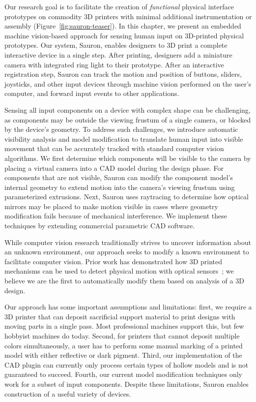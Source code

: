 Our research goal is to facilitate the creation of \emph{functional} physical interface prototypes on commodity 3D printers with minimal additional instrumentation or assembly (Figure~\ref{fig:sauron-teaser}). In this chapter, we present an embedded machine vision-based approach for sensing human input on 3D-printed physical prototypes. Our system, Sauron, enables designers to 3D print a complete interactive device in a single step. After printing, designers add a miniature camera with integrated ring light to their prototype. After an interactive registration step, Sauron can track the motion and position of buttons, sliders, joysticks, and other input devices through machine vision performed on the user's computer, and forward input events to other applications.

Sensing all input components on a device with complex shape can be challenging, as components may be outside the viewing frustum of a single camera, or blocked by the device's geometry. To address such challenges, we introduce automatic visibility analysis and model modification 
to translate human input into visible movement that can be accurately tracked with standard computer vision algorithms. We first determine which components will be visible to the camera by placing a virtual camera into a CAD model during the design phase. For components that are not visible, Sauron can modify the component model's internal geometry to extend motion into the camera's viewing frustum using parameterized extrusions. Next, Sauron uses raytracing to determine how optical mirrors may be placed to make motion visible in cases where geometry modification fails because of mechanical interference. We implement these techniques by extending commercial parametric CAD software.

While computer vision research traditionally strives to uncover information about an unknown environment, our approach seeks to modify a known environment to facilitate computer vision. Prior work has demonstrated how 3D printed mechanisms can be used to detect physical motion with optical sensors~\cite{willis-printedoptics}; we believe we are the first to automatically modify them based on analysis of a 3D design.

Our approach has some important assumptions and limitations: first, we require a 3D printer that can deposit sacrificial support material to print designs with moving parts in a single pass. Most professional machines support this, but few hobbyist machines do today. Second, for printers that cannot deposit multiple colors simultaneously, a user has to perform some manual marking of a printed model with either reflective or dark pigment. Third, our implementation of the CAD plugin can currently only process certain types of hollow models and is not guaranteed to succeed. Fourth, our current model modification techniques only work for a subset of input components. Despite these limitations, Sauron enables construction of a useful variety of devices.

